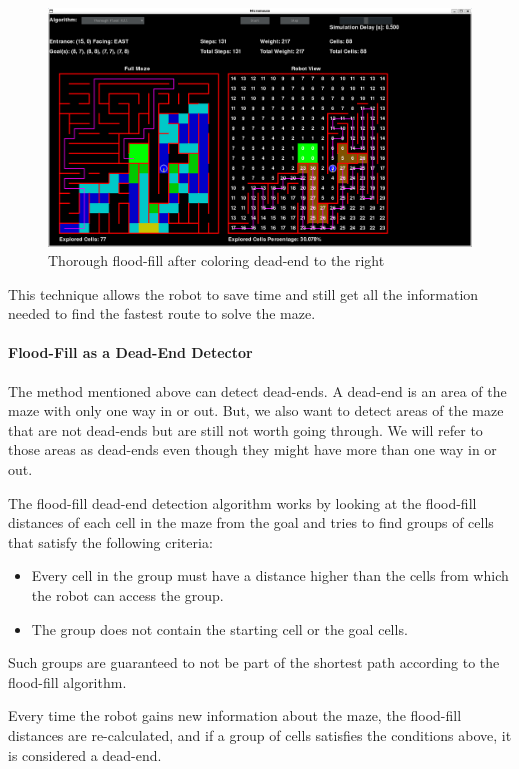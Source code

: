 \documentclass[12pt]{article}
\begin{document}
\begin{figure}[H]
\centering
\includegraphics[width=\textwidth]{images/thorough_dead_end_after.png}
\caption{Thorough flood-fill after coloring dead-end to the right}
\label{After dead-end detection}
\end{figure}

This technique allows the robot to save time and still get all the information needed to find the fastest route to solve the \gls{maze}.

\paragraph{Flood-Fill as a Dead-End Detector}
The method mentioned above can detect dead-ends.
A dead-end is an area of the \gls{maze} with only one way in or out.
But, we also want to detect areas of the \gls{maze} that are not dead-ends but are still not worth going through.
We will refer to those areas as dead-ends even though they might have more than one way in or out.

The flood-fill dead-end detection algorithm works by looking at the flood-fill distances of each \gls{cell} in the \gls{maze} from the goal and tries to find groups of \gls{cell}s that satisfy the following criteria:
\begin{itemize}
    \item Every \gls{cell} in the group must have a distance higher than the \gls{cell}s from which the robot can access the group.
    \item The group does not contain the starting \gls{cell} or the goal \gls{cell}s.
\end{itemize}
Such groups are guaranteed to not be part of the shortest path according to the flood-fill algorithm.

Every time the robot gains new information about the \gls{maze}, the flood-fill distances are re-calculated, and if a group of \gls{cell}s satisfies the conditions above, it is considered a dead-end.
\end{document}
